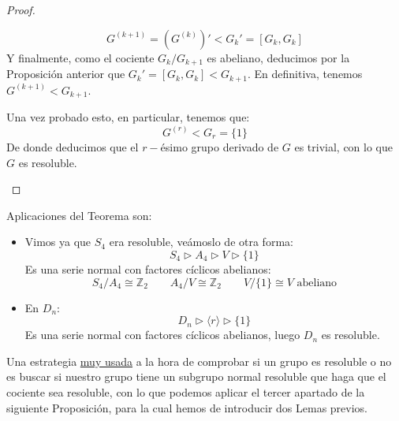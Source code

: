 \begin{teo}
\begin{proof}
\begin{description}
\begin{itemize}
                        \begin{equation*}
                            G^{(k+1)} = (G^{(k)})' < G_k' = [G_k, G_k]
                        \end{equation*}
                        Y finalmente, como el cociente $G_k/G_{k+1}$ es abeliano, deducimos por la Proposición anterior que $G_k' = [G_k, G_k] < G_{k+1}$. En definitiva, tenemos $G^{(k+1)} < G_{k+1}$.
                \end{itemize}
                Una vez probado esto, en particular, tenemos que:
                \begin{equation*}
                    G^{(r)} < G_r = \{1\}
                \end{equation*}
                De donde deducimos que el $r-$ésimo grupo derivado de $G$ es trivial, con lo que $G$ es resoluble.
        \end{description}
    \end{proof}
\end{teo}

\begin{ejemplo}
    Aplicaciones del Teorema son:
    \begin{itemize}
        \item Vimos ya que $S_4$ era resoluble, veámoslo de otra forma:
            \begin{equation*}
                S_4 \rhd A_4 \rhd V \rhd \{1\}
            \end{equation*}
            Es una serie normal con factores cíclicos abelianos:
            \begin{equation*}
                S_4/A_4\cong \mathbb{Z}_2 \qquad A_4/V\cong \mathbb{Z}_2 \qquad V/\{1\}\cong V \text{\ abeliano}
            \end{equation*}
        \item En $D_n$:
            \begin{equation*}
                D_n \rhd \langle r \rangle  \rhd \{1\}
            \end{equation*}
            Es una serie normal con factores cíclicos abelianos, luego $D_n$ es resoluble.
    \end{itemize}
\end{ejemplo}

\noindent
Una estrategia \underline{muy usada} a la hora de comprobar si un grupo es resoluble o no es buscar si nuestro grupo tiene un subgrupo normal resoluble que haga que el cociente sea resoluble, con lo que podemos aplicar el tercer apartado de la siguiente Proposición, para la cual hemos de introducir dos Lemas previos.

